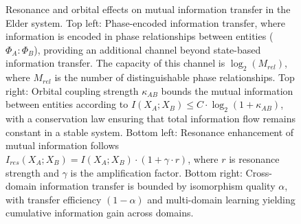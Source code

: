\begin{figure}[t]
\caption{Resonance and orbital effects on mutual information transfer in the Elder system. Top left: Phase-encoded information transfer, where information is encoded in phase relationships between entities ($\Phi_A : \Phi_B$), providing an additional channel beyond state-based information transfer. The capacity of this channel is $\log_2(M_{rel})$, where $M_{rel}$ is the number of distinguishable phase relationships. Top right: Orbital coupling strength $\kappa_{AB}$ bounds the mutual information between entities according to $I(X_A; X_B) \leq C \cdot \log_2(1 + \kappa_{AB})$, with a conservation law ensuring that total information flow remains constant in a stable system. Bottom left: Resonance enhancement of mutual information follows $I_{res}(X_A; X_B) = I(X_A; X_B) \cdot (1 + \gamma \cdot r)$, where $r$ is resonance strength and $\gamma$ is the amplification factor. Bottom right: Cross-domain information transfer is bounded by isomorphism quality $\alpha$, with transfer efficiency $(1 - \alpha)$ and multi-domain learning yielding cumulative information gain across domains.}
\label{fig:resonance_orbital_effects}
\end{figure}
